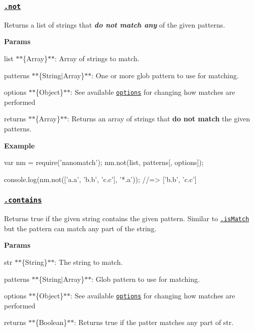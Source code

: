 \subsubsection*{\href{index.js#L359}{\tt .not}}

Returns a list of strings that {\itshape {\bfseries do not match any}} of the given {\ttfamily patterns}.

{\bfseries Params}


\begin{DoxyItemize}
\item {\ttfamily list} $\ast$$\ast$\{Array\}$\ast$$\ast$\+: Array of strings to match.
\item {\ttfamily patterns} $\ast$$\ast$\{String$\vert$\+Array\}$\ast$$\ast$\+: One or more glob pattern to use for matching.
\item {\ttfamily options} $\ast$$\ast$\{Object\}$\ast$$\ast$\+: See available \href{#options}{\tt options} for changing how matches are performed
\item {\ttfamily returns} $\ast$$\ast$\{Array\}$\ast$$\ast$\+: Returns an array of strings that {\bfseries do not match} the given patterns.
\end{DoxyItemize}

{\bfseries Example}


\begin{DoxyCode}
var nm = require('nanomatch');
nm.not(list, patterns[, options]);

console.log(nm.not(['a.a', 'b.b', 'c.c'], '*.a'));
//=> ['b.b', 'c.c']
\end{DoxyCode}


\subsubsection*{\href{index.js#L394}{\tt .contains}}

Returns true if the given {\ttfamily string} contains the given pattern. Similar to \href{#isMatch}{\tt .is\+Match} but the pattern can match any part of the string.

{\bfseries Params}


\begin{DoxyItemize}
\item {\ttfamily str} $\ast$$\ast$\{String\}$\ast$$\ast$\+: The string to match.
\item {\ttfamily patterns} $\ast$$\ast$\{String$\vert$\+Array\}$\ast$$\ast$\+: Glob pattern to use for matching.
\item {\ttfamily options} $\ast$$\ast$\{Object\}$\ast$$\ast$\+: See available \href{#options}{\tt options} for changing how matches are performed
\item {\ttfamily returns} $\ast$$\ast$\{Boolean\}$\ast$$\ast$\+: Returns true if the patter matches any part of {\ttfamily str}.
\end{DoxyItemize}

